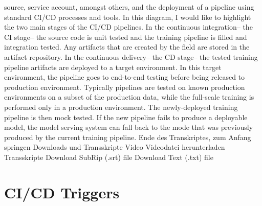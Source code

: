 {{{    source, service account, amongst others, and the deployment of a pipeline
    using standard CI/CD processes and tools.
    In this diagram, I would like to highlight the two
    main stages of the CI/CD pipelines.
    In the continuous integration-- the CI stage--
    the source code is unit tested and the training pipeline is filled
    and integration tested.
    Any artifacts that are created by the field
    are stored in the artifact repository.
    In the continuous delivery-- the CD stage--
    the tested training pipeline artifacts are deployed to a target environment.
    In this target environment, the pipeline goes to end-to-end testing
    before being released to production environment.
    Typically pipelines are tested on known production environments
    on a subset of the production data, while the full-scale training
    is performed only in a production environment.
    The newly-deployed training pipeline is then mock tested.
    If the new pipeline fails to produce a deployable model,
    the model serving system can fall back to the mode
    that was previously produced by the current training pipeline.
    Ende des Transkriptes, zum Anfang springen
    Downloads und Transskripte
    Video
    Videodatei herunterladen
    Transskripte
    Download SubRip (.srt) file
    Download Text (.txt) file
    
\section{CI/CD Triggers}

}}}
